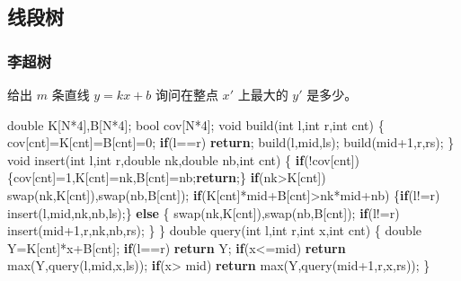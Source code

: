 \documentclass[
]{article}
\newenvironment{Shaded}{}{}
\newcommand{\ControlFlowTok}[1]{\textcolor[rgb]{0.00,0.44,0.13}{\textbf{#1}}}
\newcommand{\DataTypeTok}[1]{\textcolor[rgb]{0.56,0.13,0.00}{#1}}
\newcommand{\DecValTok}[1]{\textcolor[rgb]{0.25,0.63,0.44}{#1}}
\newcommand{\NormalTok}[1]{#1}
\begin{document}
\hypertarget{ux7ebfux6bb5ux6811}{%
\subsection{线段树}\label{ux7ebfux6bb5ux6811}}

\hypertarget{ux674eux8d85ux6811}{%
\subsubsection{李超树}\label{ux674eux8d85ux6811}}

给出 \(m\) 条直线 \(y=kx+b\) 询问在整点 \(x'\) 上最大的 \(y'\) 是多少。

\begin{Shaded}
\begin{Highlighting}[]
\DataTypeTok{double}\NormalTok{ K[N*}\DecValTok{4}\NormalTok{],B[N*}\DecValTok{4}\NormalTok{];}
\DataTypeTok{bool}\NormalTok{ cov[N*}\DecValTok{4}\NormalTok{];}
\DataTypeTok{void}\NormalTok{ build(}\DataTypeTok{int}\NormalTok{ l,}\DataTypeTok{int}\NormalTok{ r,}\DataTypeTok{int}\NormalTok{ cnt)}
\NormalTok{\{}
\NormalTok{    cov[cnt]=K[cnt]=B[cnt]=}\DecValTok{0}\NormalTok{;}
    \ControlFlowTok{if}\NormalTok{(l==r) }\ControlFlowTok{return}\NormalTok{;}
\NormalTok{    build(l,mid,ls);}
\NormalTok{    build(mid+}\DecValTok{1}\NormalTok{,r,rs);}
\NormalTok{\}}
\DataTypeTok{void}\NormalTok{ insert(}\DataTypeTok{int}\NormalTok{ l,}\DataTypeTok{int}\NormalTok{ r,}\DataTypeTok{double}\NormalTok{ nk,}\DataTypeTok{double}\NormalTok{ nb,}\DataTypeTok{int}\NormalTok{ cnt)}
\NormalTok{\{}
    \ControlFlowTok{if}\NormalTok{(!cov[cnt])\{cov[cnt]=}\DecValTok{1}\NormalTok{,K[cnt]=nk,B[cnt]=nb;}\ControlFlowTok{return}\NormalTok{;\}}
    \ControlFlowTok{if}\NormalTok{(nk\textgreater{}K[cnt]) swap(nk,K[cnt]),swap(nb,B[cnt]);}
    \ControlFlowTok{if}\NormalTok{(K[cnt]*mid+B[cnt]\textgreater{}nk*mid+nb)}
\NormalTok{        \{}\ControlFlowTok{if}\NormalTok{(l!=r) insert(l,mid,nk,nb,ls);\}}
    \ControlFlowTok{else}
\NormalTok{    \{}
\NormalTok{        swap(nk,K[cnt]),swap(nb,B[cnt]);}
        \ControlFlowTok{if}\NormalTok{(l!=r) insert(mid+}\DecValTok{1}\NormalTok{,r,nk,nb,rs);}
\NormalTok{    \}}
\NormalTok{\}}
\DataTypeTok{double}\NormalTok{ query(}\DataTypeTok{int}\NormalTok{ l,}\DataTypeTok{int}\NormalTok{ r,}\DataTypeTok{int}\NormalTok{ x,}\DataTypeTok{int}\NormalTok{ cnt)}
\NormalTok{\{}
    \DataTypeTok{double}\NormalTok{ Y=K[cnt]*x+B[cnt];}
    \ControlFlowTok{if}\NormalTok{(l==r) }\ControlFlowTok{return}\NormalTok{ Y;}
    \ControlFlowTok{if}\NormalTok{(x\textless{}=mid) }\ControlFlowTok{return}\NormalTok{ max(Y,query(l,mid,x,ls));}
    \ControlFlowTok{if}\NormalTok{(x\textgreater{} mid) }\ControlFlowTok{return}\NormalTok{ max(Y,query(mid+}\DecValTok{1}\NormalTok{,r,x,rs));}
\NormalTok{\}}
\end{Highlighting}
\end{Shaded}
\end{document}

